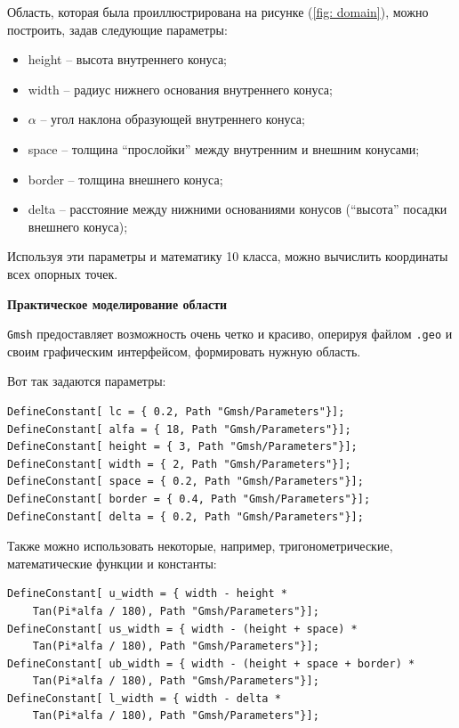 \documentclass[a4paper, 14pt]{extreport}
\begin{document}
Область, которая была проиллюстрирована на рисунке (\ref{fig: domain}),
можно построить, задав следующие параметры:
\begin{itemize}
	\item height -- высота внутреннего конуса;
	\item width -- радиус нижнего основания внутреннего конуса;
	\item $\alpha$ -- угол наклона образующей внутреннего конуса;
	\item space -- толщина \enquote{прослойки} между внутренним и внешним 
	конусами;
	\item border -- толщина внешнего конуса;
	\item delta -- расстояние между нижними основаниями конусов 
	(\enquote{высота} посадки внешнего конуса);
\end{itemize}

Используя эти параметры и математику 10 класса,
можно вычислить координаты всех опорных точек.

\textbf{Практическое моделирование области}

\texttt{Gmsh} предоставляет возможность очень четко и красиво,
 оперируя файлом \texttt{.geo} и своим графическим интерфейсом,  
формировать нужную область.

Вот так задаются параметры:
\begin{lstlisting}
DefineConstant[ lc = { 0.2, Path "Gmsh/Parameters"}];
DefineConstant[ alfa = { 18, Path "Gmsh/Parameters"}];
DefineConstant[ height = { 3, Path "Gmsh/Parameters"}];
DefineConstant[ width = { 2, Path "Gmsh/Parameters"}];
DefineConstant[ space = { 0.2, Path "Gmsh/Parameters"}];
DefineConstant[ border = { 0.4, Path "Gmsh/Parameters"}];
DefineConstant[ delta = { 0.2, Path "Gmsh/Parameters"}];
\end{lstlisting}

Также можно использовать некоторые, например, тригонометрические,
математические функции и константы:

\begin{lstlisting}
DefineConstant[ u_width = { width - height * 
	Tan(Pi*alfa / 180), Path "Gmsh/Parameters"}];
DefineConstant[ us_width = { width - (height + space) * 
	Tan(Pi*alfa / 180), Path "Gmsh/Parameters"}];
DefineConstant[ ub_width = { width - (height + space + border) * 
	Tan(Pi*alfa / 180), Path "Gmsh/Parameters"}];
DefineConstant[ l_width = { width - delta * 
	Tan(Pi*alfa / 180), Path "Gmsh/Parameters"}];
\end{lstlisting}
\end{document}
